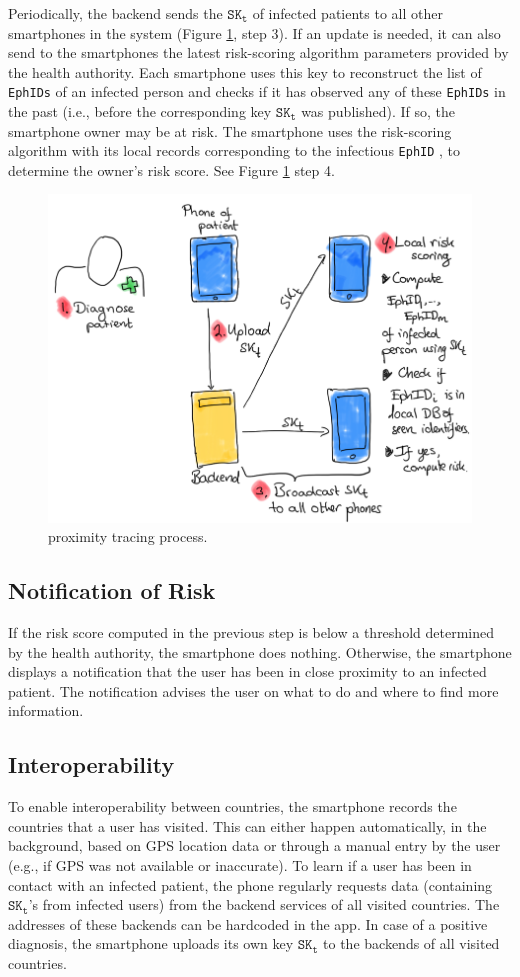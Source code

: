 \documentclass[12pt,a4paper]{article}
\begin{document}
Periodically, the backend sends the $\texttt{SK}_\texttt{t}$ of infected patients to all other smartphones in the system (Figure \ref{PT}, step 3). If an update is needed, it can also send to the smartphones the latest risk-scoring algorithm parameters provided by the health authority. Each smartphone uses this key to reconstruct the list of \texttt{EphIDs} of an infected person and checks if it has observed any of these \texttt{EphIDs} in the past (i.e., before the corresponding key $\texttt{SK}_\texttt{t}$ was published). If so, the smartphone owner may be at risk. The smartphone uses the risk-scoring algorithm with its local records corresponding to the infectious \texttt{EphID} , to determine the owner’s risk score. See Figure \ref{PT} step 4.
\begin{figure}[H]
\centering
\includegraphics[scale=0.65]{fig/PT}
\caption{proximity tracing process.}
\label{PT}
\end{figure}
\subsection*{Notification of Risk}
If the risk score computed in the previous step is below a threshold determined by the health authority, the smartphone does nothing. Otherwise, the smartphone displays a notification that the user has been in close proximity to an infected patient. The notification advises the user on what to do and where to find more information.
\subsection*{Interoperability}
To enable interoperability between countries, the smartphone records the countries that a
user has visited. This can either happen automatically, in the background, based on GPS
location data or through a manual entry by the user (e.g., if GPS was not available or
inaccurate). To learn if a user has been in contact with an infected patient, the phone
regularly requests data (containing $\texttt{SK}_\texttt{t}$’s from infected users) from the backend services of all visited countries. The addresses of these backends can be hardcoded in the app. In case of a positive diagnosis, the smartphone uploads its own key $\texttt{SK}_\texttt{t}$ to the backends of all visited countries.
\end{document}

